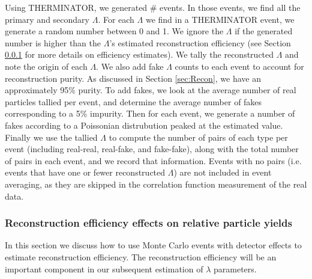 
Using THERMINATOR, we generated \# events. In those events, we find all the primary and secondary $\Lambda$. 
For each $\Lambda$ we find in a THERMINATOR event, we generate a random number between 0 and 1. 
We ignore the $\Lambda$ if the generated number is higher than the $\Lambda$'s estimated reconstruction efficiency (see Section \ref{sec:ReconstructionEff} for more details on efficiency estimates). 
We tally the reconstructed $\Lambda$ and note the origin of each $\Lambda$.
We also add fake $\Lambda$ counts to each event to account for reconstruction purity.
As discussed in Section \ref{sec:Recon}, we have an approximately 95\% purity.
To add fakes, we look at the average number of real particles tallied per event, and determine the average number of fakes corresponding to a 5\% impurity.
Then for each event, we generate a number of fakes according to a Poissonian distrubution peaked at the estimated value.
Finally we use the tallied $\Lambda$ to compute the number of pairs of each type per event (including real-real, real-fake, and fake-fake), along with the total number of pairs in each event, and we record that information.
Events with no pairs (i.e. events that have one or fewer reconstructed $\Lambda$) are not included in event averaging, as they are skipped in the correlation function measurement of the real data.



\subsubsection{Reconstruction efficiency effects on relative particle yields}
\label{sec:ReconstructionEff}

In this section we discuss how to use Monte Carlo events with detector effects to estimate reconstruction efficiency.  
The reconstruction efficiency will be an important component in our subsequent estimation of $\lambda$ parameters.






